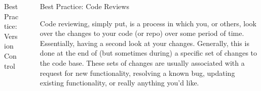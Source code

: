 \documentclass[final]{beamer}
\newlength{\sepwidth}
\newlength{\colwidth}
\newcommand{\separatorcolumn}{\begin{column}{\sepwidth}\end{column}}
\begin{document}
\begin{frame}[t]
\begin{columns}[t]
\begin{column}{\colwidth}
\begin{block}{Best Practice: Version Control}

  \end{block}

\end{column}

\separatorcolumn

\begin{column}{\colwidth}

  \begin{block}{Best Practice: Code Reviews}

    Code reviewing, simply put, is a process in which you, or others, look over
    the changes to your code (or repo) over some period of time.
    Essentially, having a second look at your changes.
    Generally, this is done at the end of (but sometimes during) a specific set
    of changes to the code base.
    These sets of changes are usually associated with a request for new
    functionality, resolving a known bug, updating existing functionality, or
    really anything you'd like.
  

\end{block}
\end{column}
\end{columns}
\end{frame}
\end{document}
